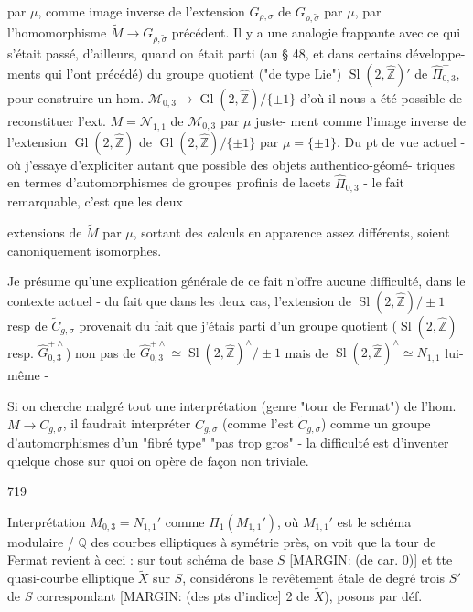 par $\mu$, comme image inverse de l'extension
$G_{\rho,\sigma}$ de $G_{\rho,\tilde{\sigma}}$ par $\mu$, par l'homomorphisme
$\tilde{M} \to G_{\rho,\tilde{\sigma}}$ précédent. Il y a une
analogie frappante avec ce qui s'était
passé, d'ailleurs, quand on était
parti (au § 48, et dans certains développe-
ments qui l'ont précédé) du groupe
quotient ("de type Lie") $\operatorname{Sl}(2,\hat{\mathbb{Z}})'$ de
$\widehat{\Pi}_{0,3}^+$, pour construire un hom.
$\mathcal{M}_{0,3} \to \operatorname{Gl}(2,\hat{\mathbb{Z}})/\{\pm 1\}$
d'où il nous a été possible de reconstituer
l'ext. $M = \mathcal{N}_{1,1}$ de $\mathcal{M}_{0,3}$ par $\mu$ juste-
ment comme l'image inverse de
l'extension $\operatorname{Gl}(2,\hat{\mathbb{Z}})$ de $\operatorname{Gl}(2,\hat{\mathbb{Z}})/\{\pm 1\}$
par $\mu = \{\pm 1\}$. Du pt de vue actuel
- où j'essaye d'expliciter autant que
possible des objets authentico-géomé-
triques en termes d'automorphismes
de groupes profinis de lacets $\widehat{\Pi}_{0,3}$ - le fait
remarquable, c'est que les deux

\newpage


extensions de $\tilde{M}$ par $\mu$, sortant des
calculs en apparence assez différents,
soient canoniquement isomorphes.

Je présume qu'une explication générale
de ce fait n'offre aucune difficulté,
dans le contexte actuel - du fait que
dans les deux cas, l'extension de
$\operatorname{Sl}(2, \hat{\mathbb{Z}})/\pm 1$ resp de $\tilde{C}_{g,\sigma}$ provenait
du fait que j'étais parti d'un
groupe quotient ($\operatorname{Sl}(2, \hat{\mathbb{Z}})$ resp.
$\hat{G}_{0,3}^{+\wedge}$) non pas de $\hat{G}_{0,3}^{+\wedge} \simeq \operatorname{Sl}(2, \hat{\mathbb{Z}})^{\wedge}/\pm 1$
mais de $\operatorname{Sl}(2, \hat{\mathbb{Z}})^{\wedge} \simeq N_{1,1}$ lui-même -

Si on cherche malgré tout une
interprétation (genre "tour de Fermat")
de l'hom. $M \to C_{g,\sigma}$, il faudrait
interpréter $C_{g,\sigma}$ (comme l'est $\tilde{C}_{g,\sigma}$)
comme un groupe
d'automorphismes d'un "fibré type"
"pas trop gros" - la difficulté est
d'inventer quelque chose sur quoi on
opère de façon non triviale.

\newpage


719

Interprétation $M_{0,3} = N_{1,1}'$ comme
$\Pi_1(M_{1,1}')$, où $M_{1,1}'$ est le schéma modulaire / $\mathbb{Q}$
des courbes elliptiques à symétrie près, on
voit que la tour de Fermat revient à
ceci : sur tout schéma de base $S$ [MARGIN: (de car. 0)]
et tte quasi-courbe elliptique $\tilde{X}$ sur $S$,
considérons le revêtement étale de degré
trois $S'$ de $S$ correspondant [MARGIN: (des pts d'indice]
2 de $\tilde{X}$), posons par déf.

